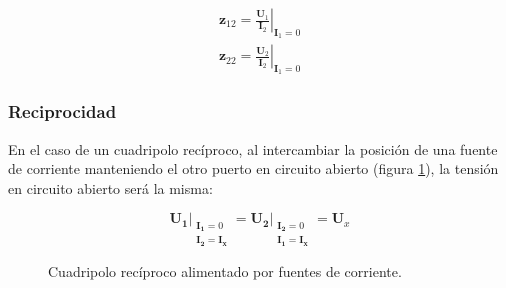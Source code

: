 \[
  \begin{array}{c}
    \mathbf{z}_{12} = \left.\frac{\mathbf{U}_1}{\mathbf{I}_2}\right\rvert_{\mathbf{I}_1 = 0}\\
    \mathbf{z}_{22} = \left.\frac{\mathbf{U}_2}{\mathbf{I}_2}\right\rvert_{\mathbf{I}_1 = 0}
  \end{array}
\]


\subsubsection{Reciprocidad}

En el caso de un cuadripolo recíproco, al intercambiar la posición de una fuente de corriente manteniendo el otro puerto en circuito abierto (figura \ref{fig:impedancia-reciprocidad}), la tensión en circuito abierto será la misma:

\[
\left.\mathbf{U_1}\right\rvert_{
  \begin{array}{l}
\mathbf{I_1} = 0\\ \mathbf{I_2} = \mathbf{I_x}
  \end{array}
} =%
\left.\mathbf{U_2}\right\rvert_{
  \begin{array}{l}
\mathbf{I_2} = 0\\ \mathbf{I_1} = \mathbf{I_x}
  \end{array}
} = \mathbf{U}_x
\]

\begin{figure}[H]
  \centering
  \hspace{2cm}
  \caption{Cuadripolo recíproco alimentado por fuentes de corriente.}
  \label{fig:impedancia-reciprocidad}
\end{figure}


